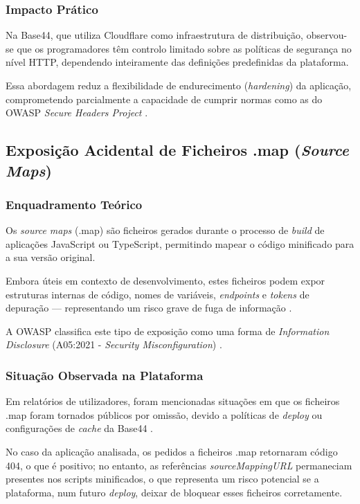 \subsubsection{Impacto Prático}

Na Base44, que utiliza Cloudflare como infraestrutura de distribuição, observou-se que os programadores têm controlo limitado sobre as políticas de segurança no nível HTTP, dependendo inteiramente das definições predefinidas da plataforma.

Essa abordagem reduz a flexibilidade de endurecimento (\textit{hardening}) da aplicação, comprometendo parcialmente a capacidade de cumprir normas como as do OWASP \textit{Secure Headers Project} \cite{ref19}.

\subsection{Exposição Acidental de Ficheiros .map (\textit{Source Maps})}

\subsubsection{Enquadramento Teórico}

Os \textit{source maps} (.map) são ficheiros gerados durante o processo de \textit{build} de aplicações JavaScript ou TypeScript, permitindo mapear o código minificado para a sua versão original.

Embora úteis em contexto de desenvolvimento, estes ficheiros podem expor estruturas internas de código, nomes de variáveis, \textit{endpoints} e \textit{tokens} de depuração — representando um risco grave de fuga de informação \cite{ref20}.

A OWASP classifica este tipo de exposição como uma forma de \textit{Information Disclosure} (A05:2021 - \textit{Security Misconfiguration}) \cite{ref2}.

\subsubsection{Situação Observada na Plataforma}

Em relatórios de utilizadores, foram mencionadas situações em que os ficheiros .map foram tornados públicos por omissão, devido a políticas de \textit{deploy} ou configurações de \textit{cache} da Base44 \cite{ref22}.

No caso da aplicação analisada, os pedidos a ficheiros .map retornaram código 404, o que é positivo; no entanto, as referências \textit{sourceMappingURL} permaneciam presentes nos scripts minificados, o que representa um risco potencial se a plataforma, num futuro \textit{deploy}, deixar de bloquear esses ficheiros corretamente.

